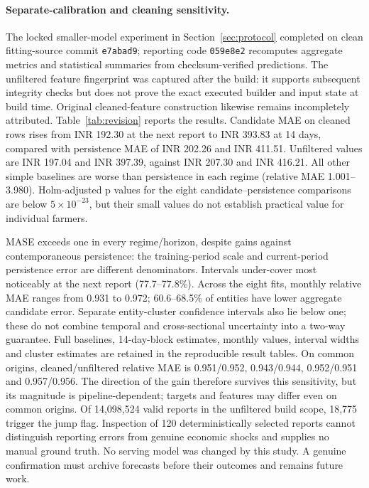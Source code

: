 \paragraph{Separate-calibration and cleaning sensitivity.}
The locked smaller-model experiment in Section~\ref{sec:protocol} completed on clean fitting-source commit \texttt{e7abad9}; reporting code \texttt{059e8e2} recomputes aggregate metrics and statistical summaries from checksum-verified predictions. The unfiltered feature fingerprint was captured after the build: it supports subsequent integrity checks but does not prove the exact executed builder and input state at build time. Original cleaned-feature construction likewise remains incompletely attributed.
Table~\ref{tab:revision} reports the results. Candidate MAE on cleaned rows rises from INR 192.30 at the next report to INR 393.83 at 14 days, compared with persistence MAE of INR 202.26 and INR 411.51. Unfiltered values are INR 197.04 and INR 397.39, against INR 207.30 and INR 416.21. All other simple baselines are worse than persistence in each regime (relative MAE 1.001--3.980). Holm-adjusted p values for the eight candidate--persistence comparisons are below $5\times10^{-23}$, but their small values do not establish practical value for individual farmers.

\begin{table}[t]\centering\small\setlength{\tabcolsep}{4pt}
\caption{Retrospective robustness with disjoint selection and calibration periods. MASE columns show candidate/persistence. Confidence intervals are paired 28-calendar-day block bootstrap intervals for relative MAE (500 replicates), conditional on fitted models.}\label{tab:revision}

\end{table}

MASE exceeds one in every regime/horizon, despite gains against contemporaneous persistence: the training-period scale and current-period persistence error are different denominators. Intervals under-cover most noticeably at the next report (77.7--77.8\%). Across the eight fits, monthly relative MAE ranges from 0.931 to 0.972; 60.6--68.5\% of entities have lower aggregate candidate error. Separate entity-cluster confidence intervals also lie below one; these do not combine temporal and cross-sectional uncertainty into a two-way guarantee. Full baselines, 14-day-block estimates, monthly values, interval widths and cluster estimates are retained in the reproducible result tables.
On common origins, cleaned/unfiltered relative MAE is 0.951/0.952, 0.943/0.944, 0.952/0.951 and 0.957/0.956. The direction of the gain therefore survives this sensitivity, but its magnitude is pipeline-dependent; targets and features may differ even on common origins. Of 14,098,524 valid reports in the unfiltered build scope, 18,775 trigger the jump flag. Inspection of 120 deterministically selected reports cannot distinguish reporting errors from genuine economic shocks and supplies no manual ground truth.
No serving model was changed by this study. A genuine confirmation must archive forecasts before their outcomes and remains future work.
